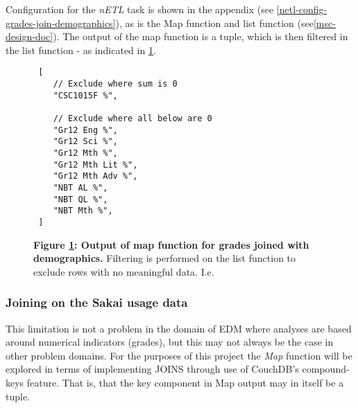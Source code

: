 Configuration for the \textit{nETL} task is shown in the appendix (see \ref{netl-config-grades-join-demographics}), as is the Map function and list function (see\ref{msc-design-doc}). The output of the map function is a tuple, which is then filtered in the list function - as indicated in \ref{grades-join-demographics-output}.

\begin{figure}[ht]
    \centering
    \begin{verbatim}
 [
    // Exclude where sum is 0
    "CSC1015F %",

    // Exclude where all below are 0 
    "Gr12 Eng %", 
    "Gr12 Sci %",
    "Gr12 Mth %",
    "Gr12 Mth Lit %",
    "Gr12 Mth Adv %",
    "NBT AL %",
    "NBT QL %",
    "NBT Mth %",
 ]    
    \end{verbatim}
    \caption[Analysis 1: Grades joined with Demographics]{\textbf{Figure \ref{grades-join-demographics-output}: Output of map function for grades joined with demographics.} Filtering is performed on the list function to exclude rows with no meaningful data. I.e. }
    \label{grades-join-demographics-output}
\end{figure}










\subsubsection*{Joining on the Sakai usage data}


This limitation is not a problem in the domain of EDM where analyses are based around numerical indicators (grades), but this may not always be the case in other problem domains. For the purposes of this project the \textit{Map} function will be explored in terms of implementing JOINS through use of CouchDB's compound-keys feature. That is, that the key component in Map output may in itself be a tuple.

